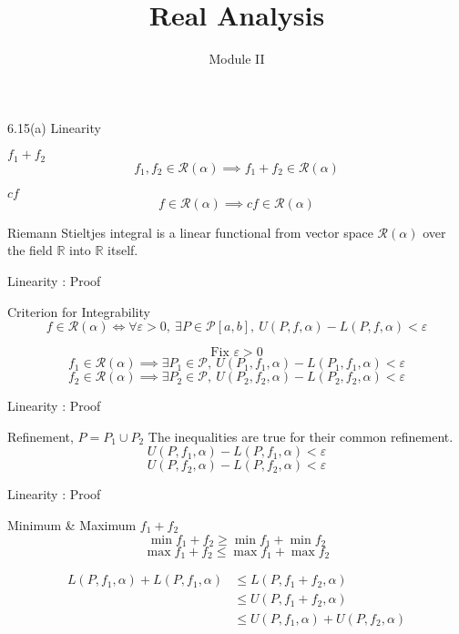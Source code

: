 \documentclass{beamer}
\title{Real Analysis}
\author{Module II}
\institute{Section 6.15 \\ Properties of Riemann Stieltjes Integral}
\begin{document}
\begin{frame}
\maketitle
\end{frame}

\begin{frame}{6.15(a) Linearity}
	\begin{block}{$f_1+f_2$}
		\[ f_1,f_2 \in \mathscr{R}(\alpha) \implies f_1+f_2 \in \mathscr{R}(\alpha) \]
	\end{block}
	\begin{block}{$cf$}
		\[ f \in \mathscr{R}(\alpha) \implies cf \in\mathscr{R}(\alpha) \]
	\end{block}
	Riemann Stieltjes integral is a linear functional from vector space $\mathscr{R}(\alpha)$ over the field $\mathbb{R}$ into $\mathbb{R}$ itself.
\end{frame}

\begin{frame}{Linearity : Proof}
\begin{block}{Criterion for Integrability}
	\[ f \in \mathscr{R}(\alpha) \iff \forall \varepsilon > 0,\ \exists P \in \mathscr{P}[a,b],\ U(P,f,\alpha)-L(P,f,\alpha) < \varepsilon \]
\end{block}
	\[ \text{Fix }\varepsilon > 0 \]
	\[ f_1 \in \mathscr{R}(\alpha) \implies \exists P_1 \in \mathscr{P},\ U(P_1,f_1,\alpha) - L(P_1,f_1,\alpha) < \varepsilon \]
	\[ f_2 \in \mathscr{R}(\alpha) \implies \exists P_2 \in \mathscr{P},\ U(P_2,f_2,\alpha) - L(P_2,f_2,\alpha) < \varepsilon \]
\end{frame}

\begin{frame}{Linearity : Proof}
\begin{block}{Refinement, $P = P_1 \cup P_2$}
	The inequalities are true for their common refinement.
	\[ U(P,f_1,\alpha) - L(P,f_1,\alpha) < \varepsilon \]
	\[ U(P,f_2,\alpha) - L(P,f_2,\alpha) < \varepsilon \]
\end{block}
\end{frame}
\begin{frame}{Linearity : Proof}
\begin{block}{Minimum \& Maximum $f_1+f_2$}
	\[ \min f_1+f_2 \ge \min f_1 + \min f_2 \]
	\[ \max f_1+f_2 \le \max f_1 + \max f_2 \]
\end{block}

\begin{align*}
	L(P,f_1,\alpha) + L(P,f_1,\alpha) & \le L(P,f_1+f_2,\alpha)\\ 
	& \le U(P,f_1+f_2,\alpha)\\
	& \le U(P,f_1,\alpha) + U(P,f_2,\alpha)
\end{align*}
\end{frame}
\end{document}
